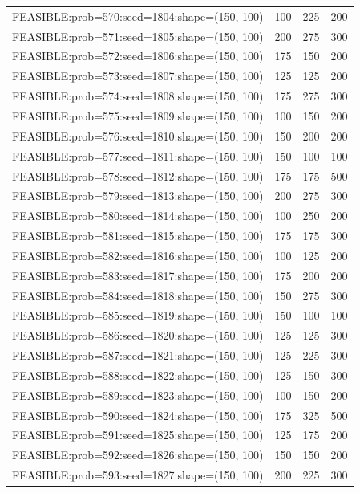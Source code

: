 \begin{longtable}{lccc}
FEASIBLE:prob=570:seed=1804:shape=(150, 100) &  100 &   225 &    200 \\
FEASIBLE:prob=571:seed=1805:shape=(150, 100) &  200 &   275 &    300 \\
FEASIBLE:prob=572:seed=1806:shape=(150, 100) &  175 &   150 &    200 \\
FEASIBLE:prob=573:seed=1807:shape=(150, 100) &  125 &   125 &    200 \\
FEASIBLE:prob=574:seed=1808:shape=(150, 100) &  175 &   275 &    300 \\
FEASIBLE:prob=575:seed=1809:shape=(150, 100) &  100 &   150 &    200 \\
FEASIBLE:prob=576:seed=1810:shape=(150, 100) &  150 &   200 &    200 \\
FEASIBLE:prob=577:seed=1811:shape=(150, 100) &  150 &   100 &    100 \\
FEASIBLE:prob=578:seed=1812:shape=(150, 100) &  175 &   175 &    500 \\
FEASIBLE:prob=579:seed=1813:shape=(150, 100) &  200 &   275 &    300 \\
FEASIBLE:prob=580:seed=1814:shape=(150, 100) &  100 &   250 &    200 \\
FEASIBLE:prob=581:seed=1815:shape=(150, 100) &  175 &   175 &    300 \\
FEASIBLE:prob=582:seed=1816:shape=(150, 100) &  100 &   125 &    200 \\
FEASIBLE:prob=583:seed=1817:shape=(150, 100) &  175 &   200 &    200 \\
FEASIBLE:prob=584:seed=1818:shape=(150, 100) &  150 &   275 &    300 \\
FEASIBLE:prob=585:seed=1819:shape=(150, 100) &  150 &   100 &    100 \\
FEASIBLE:prob=586:seed=1820:shape=(150, 100) &  125 &   125 &    300 \\
FEASIBLE:prob=587:seed=1821:shape=(150, 100) &  125 &   225 &    300 \\
FEASIBLE:prob=588:seed=1822:shape=(150, 100) &  125 &   150 &    300 \\
FEASIBLE:prob=589:seed=1823:shape=(150, 100) &  100 &   150 &    200 \\
FEASIBLE:prob=590:seed=1824:shape=(150, 100) &  175 &   325 &    500 \\
FEASIBLE:prob=591:seed=1825:shape=(150, 100) &  125 &   175 &    200 \\
FEASIBLE:prob=592:seed=1826:shape=(150, 100) &  150 &   150 &    200 \\
FEASIBLE:prob=593:seed=1827:shape=(150, 100) &  200 &   225 &    300 \\

\end{longtable}
